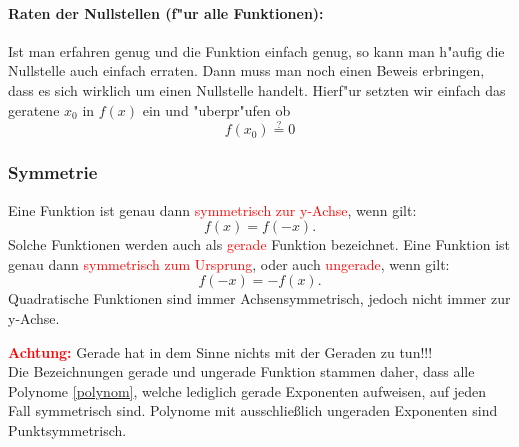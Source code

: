 \paragraph{Raten der Nullstellen (f"ur alle Funktionen):}
Ist man erfahren genug und die Funktion einfach genug, so kann man h"aufig die Nullstelle auch einfach erraten. Dann muss man noch einen Beweis erbringen, dass es sich wirklich um einen Nullstelle handelt. Hierf"ur setzten wir einfach das geratene $x_0$ in $f(x)$ ein und "uberpr"ufen ob 
\begin{equation*}
f(x_0) \stackrel{?}{=} 0
\end{equation*}


\subsubsection{Symmetrie} \label{sec:symmetrie}
Eine Funktion ist genau dann \textcolor{red}{symmetrisch zur y-Achse}, wenn gilt:
\begin{equation*}
f(x)=f(-x).
\end{equation*}
Solche Funktionen werden auch als \textcolor{red}{gerade} Funktion bezeichnet. Eine Funktion ist genau dann \textcolor{red}{symmetrisch zum Ursprung}, oder auch \textcolor{red}{ungerade}, wenn gilt:
\begin{equation*}
f(-x)=-f(x).
\end{equation*}
Quadratische Funktionen sind immer Achsensymmetrisch, jedoch nicht immer zur y-Achse.
\begin{warning}
	\textbf{\textcolor{red}{Achtung:}} Gerade hat in dem Sinne nichts mit der Geraden zu tun!!!\\
	Die Bezeichnungen gerade und ungerade Funktion stammen daher, dass alle Polynome \ref{polynom}, welche lediglich gerade Exponenten aufweisen, auf jeden Fall symmetrisch sind. Polynome mit ausschließlich ungeraden Exponenten sind Punktsymmetrisch.
\end{warning}
